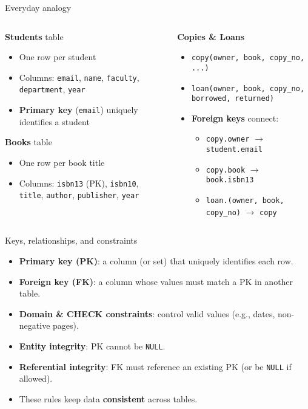 \documentclass{beamer}
\begin{document}
\begin{frame}{Everyday analogy}
\begin{columns}[T,onlytextwidth]
\begin{column}{0.55\linewidth}
\textbf{Students} table
\begin{itemize}
  \item One row per student
  \item Columns: \texttt{email}, \texttt{name}, \texttt{faculty}, \texttt{department}, \texttt{year}
  \item \textbf{Primary key} (\texttt{email}) uniquely identifies a student
\end{itemize}
\medskip
\textbf{Books} table
\begin{itemize}
  \item One row per book title
  \item Columns: \texttt{isbn13} (PK), \texttt{isbn10}, \texttt{title}, \texttt{author}, \texttt{publisher}, \texttt{year}
\end{itemize}
\end{column}
\begin{column}{0.45\linewidth}
\textbf{Copies \& Loans}
\begin{itemize}
  \item \texttt{copy(owner, book, copy\_no, ...)}
  \item \texttt{loan(owner, book, copy\_no, borrowed, returned)}
  \item \textbf{Foreign keys} connect:
  \begin{itemize}
    \item \texttt{copy.owner} $\to$ \texttt{student.email}
    \item \texttt{copy.book} $\to$ \texttt{book.isbn13}
    \item \texttt{loan.(owner, book, copy\_no)} $\to$ \texttt{copy}
  \end{itemize}
\end{itemize}
\end{column}
\end{columns}
\end{frame}

\begin{frame}{Keys, relationships, and constraints}
\begin{itemize}
  \item \textbf{Primary key (PK)}: a column (or set) that uniquely identifies each row.
  \item \textbf{Foreign key (FK)}: a column whose values must match a PK in another table.
  \item \textbf{Domain \& CHECK constraints}: control valid values (e.g., dates, non-negative pages).
  \item \textbf{Entity integrity}: PK cannot be \texttt{NULL}.
  \item \textbf{Referential integrity}: FK must reference an existing PK (or be \texttt{NULL} if allowed).
  \item These rules keep data \textbf{consistent} across tables.
\end{itemize}
\end{frame}
\end{document}
